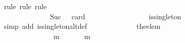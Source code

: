 \begin{isabellebody}
\ {\isacharparenleft}rule{\isacharcomma}\ rule{\isacharcomma}\ rule{\isacharparenright}\isanewline
\ \ \ \ \ \ \ \ \isamarkupfalse%
\ {\isacharminus}\ \isanewline
\ \ \ \ \ \ \ \ \ \ \isamarkupfalse%
\ {\isasymsigma}\ {\isasymsigma}{\isacharprime}\isanewline
\ \ \ \ \ \ \ \ \ \ \isamarkupfalse%
\ {\isachardoublequoteopen}{\isasymsigma}\ {\isasymin}\ {\isasymSigma}{\isachardoublequoteclose}\ \ {\isachardoublequoteopen}{\isasymsigma}{\isacharprime}\ {\isasymin}\ {\isasymSigma}{\isachardoublequoteclose}\ \ {\isachardoublequoteopen}{\isasymnot}\ {\isasymsigma}\ {\isasymsubseteq}\ {\isasymsigma}{\isacharprime}\ {\isasymand}\ Suc\ {}\ {\isacharequal}\ card\ {\isacharparenleft}{\isasymsigma}\ {\isacharminus}\ {\isasymsigma}{\isacharprime}{\isacharparenright}{\isachardoublequoteclose}\ \isanewline
\ \ \ \ \ \ \ \ \ \ \isamarkupfalse%
\ \isamarkupfalse%
\ {\isachardoublequoteopen}is{\isacharunderscore}singleton\ {\isacharparenleft}{\isasymsigma}\ {\isacharminus}\ {\isasymsigma}{\isacharprime}{\isacharparenright}{\isachardoublequoteclose}\isanewline
\ \ \ \ \ \ \ \ \ \ \ \ \isamarkupfalse%
\ {\isacharparenleft}simp\ add{\isacharcolon}\ is{\isacharunderscore}singleton{\isacharunderscore}altdef{\isacharparenright}\isanewline
\ \ \ \ \ \ \ \ \ \ \isamarkupfalse%
\ \isamarkupfalse%
\ {\isachardoublequoteopen}{\isacharbraceleft}the{\isacharunderscore}elem\ {\isacharparenleft}{\isasymsigma}\ {\isacharminus}\ {\isasymsigma}{\isacharprime}{\isacharparenright}{\isacharbraceright}\ {\isasymunion}\ {\isasymsigma}{\isacharprime}\ {\isasymin}\ {\isasymSigma}{\isachardoublequoteclose}\isanewline
\ \ \ \ \ \ \ \ \ \ \ \ \isamarkupfalse%
\ {\isacartoucheopen}{\isasymforall}\ {\isasymsigma}\ {\isasymin}\ {\isasymSigma}{\isachardot}\ {\isasymforall}\ {\isasymsigma}{\isacharprime}\ {\isasymin}\ {\isasymSigma}{\isachardot}\ {\isasymnot}\ {\isasymsigma}\ {\isasymsubseteq}\ {\isasymsigma}{\isacharprime}\ {\isasymlongrightarrow}\ {\isacharparenleft}{\isasymexists}\ m\ {\isasymin}\ {\isasymsigma}\ {\isacharminus}\ {\isasymsigma}{\isacharprime}{\isachardot}\ {\isasymsigma}{\isacharprime}\ {\isasymunion}\ {\isacharbraceleft}m{\isacharbraceright}\ {\isasymin}\ {\isasymSigma}{\isacharparenright}{\isacartoucheclose}\ {\isacartoucheopen}{\isasymsigma}\ {\isasymin}\ {\isasymSigma}{\isacartoucheclose}\ {\isacartoucheopen}{\isasymsigma}{\isacharprime}\ {\isasymin}\ {\isasymSigma}{\isacartoucheclose}\isanewline

\end{isabellebody}
